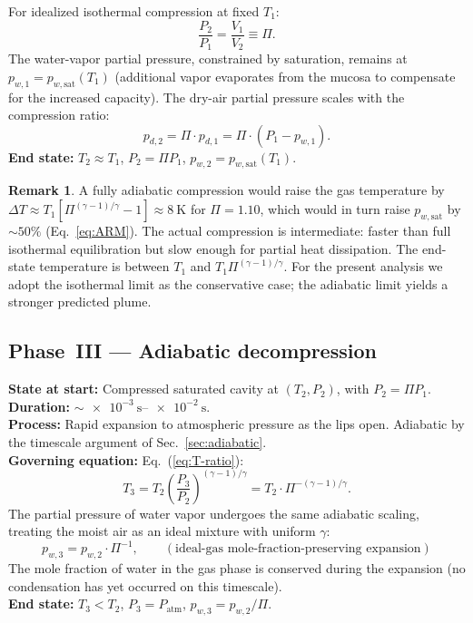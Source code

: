 \documentclass[11pt,a4paper]{article}
\newcommand{\pwsat}{p_{w,\text{sat}}}
\theoremstyle{definition}
\newtheorem{remark}{Remark}[section]
\theoremstyle{plain}
\begin{document}
For idealized isothermal compression at fixed $T_1$:
\begin{equation}
\frac{P_2}{P_1} = \frac{V_1}{V_2} \equiv \Pi.
\end{equation}
The water-vapor partial pressure, constrained by saturation, remains at $p_{w,1} = \pwsat(T_1)$ (additional vapor evaporates from the mucosa to compensate for the increased capacity). The dry-air partial pressure scales with the compression ratio:
\begin{equation}
p_{d,2} = \Pi \cdot p_{d,1} = \Pi \cdot (P_1 - p_{w,1}).
\end{equation}
\textbf{End state:} $T_2 \approx T_1$, $P_2 = \Pi P_1$, $p_{w,2} = \pwsat(T_1)$.

\begin{remark}
A fully adiabatic compression would raise the gas temperature by $\Delta T \approx T_1[\Pi^{(\gamma-1)/\gamma} - 1] \approx \SI{8}{\kelvin}$ for $\Pi = 1.10$, which would in turn raise $\pwsat$ by $\sim\!50\%$ (Eq.~\ref{eq:ARM}). The actual compression is intermediate: faster than full isothermal equilibration but slow enough for partial heat dissipation. The end-state temperature is between $T_1$ and $T_1\Pi^{(\gamma-1)/\gamma}$. For the present analysis we adopt the isothermal limit as the conservative case; the adiabatic limit yields a stronger predicted plume.
\end{remark}

\subsection{Phase~III — Adiabatic decompression}
\label{sec:phase3}

\textbf{State at start:} Compressed saturated cavity at $(T_2, P_2)$, with $P_2 = \Pi P_1$.\\
\textbf{Duration:} $\sim\!\SIrange{e-3}{e-2}{\second}$.\\
\textbf{Process:} Rapid expansion to atmospheric pressure as the lips open. Adiabatic by the timescale argument of Sec.~\ref{sec:adiabatic}.\\
\textbf{Governing equation:} Eq.~(\ref{eq:T-ratio}):
\begin{equation}
\label{eq:T3}
T_3 = T_2 \left(\frac{P_3}{P_2}\right)^{(\gamma-1)/\gamma} = T_2 \cdot \Pi^{-(\gamma-1)/\gamma}.
\end{equation}
The partial pressure of water vapor undergoes the same adiabatic scaling, treating the moist air as an ideal mixture with uniform $\gamma$:
\begin{equation}
\label{eq:pw3}
p_{w,3} = p_{w,2} \cdot \Pi^{-1}, \qquad (\text{ideal-gas mole-fraction-preserving expansion})
\end{equation}
The mole fraction of water in the gas phase is conserved during the expansion (no condensation has yet occurred on this timescale).\\
\textbf{End state:} $T_3 < T_2$, $P_3 = P_{\text{atm}}$, $p_{w,3} = p_{w,2}/\Pi$.
\end{document}
